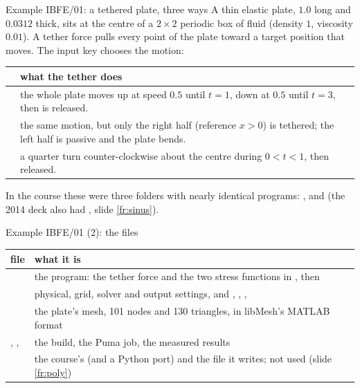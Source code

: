 \documentclass[aspectratio=169,11pt]{beamer}
\begin{document}
\begin{frame}{Example IBFE/01: a tethered plate, three ways}
\label{fr:example}
\footnotesize
A thin elastic plate, $1.0$ long and $0.0312$ thick, sits at the centre of a $2\times2$ periodic box of fluid (density $1$, viscosity $0.01$). A tether force pulls every point of the plate toward a target position that moves. The input key  chooses the motion:

\begin{tabular}{@{}lL{0.74\textwidth}@{}}
\toprule
{} & what the tether does \\
\midrule
{} & the whole plate moves up at speed $0.5$ until $t = 1$, down at $0.5$ until $t = 3$, then is released. \\
 & the same motion, but only the right half (reference $x > 0$) is tethered; the left half is passive and the plate bends. \\
 & a quarter turn counter-clockwise about the centre during $0 < t < 1$, then released. \\
\bottomrule
\end{tabular}

\medskip
In the course these were three folders with nearly identical programs: ,  and  (the 2014 deck also had , slide \ref{fr:sinus}).
\end{frame}

\begin{frame}{Example IBFE/01 (2): the files}
\label{fr:files}
\footnotesize
\begin{tabular}{@{}L{0.30\textwidth}L{0.62\textwidth}@{}}
\toprule
file & what it is \\
\midrule
{} & the program: the tether force and the two stress functions in , then  \\
 & physical, grid, solver and output settings, and , , ,  \\
 & the plate's mesh, 101 nodes and 130 triangles, in libMesh's MATLAB format \\
, ,  & the build, the Puma job, the measured results \\
 & the course's  (and a Python port) and the  file it writes; not used (slide \ref{fr:poly}) \\
\bottomrule
\end{tabular}

\end{frame}
\end{document}
